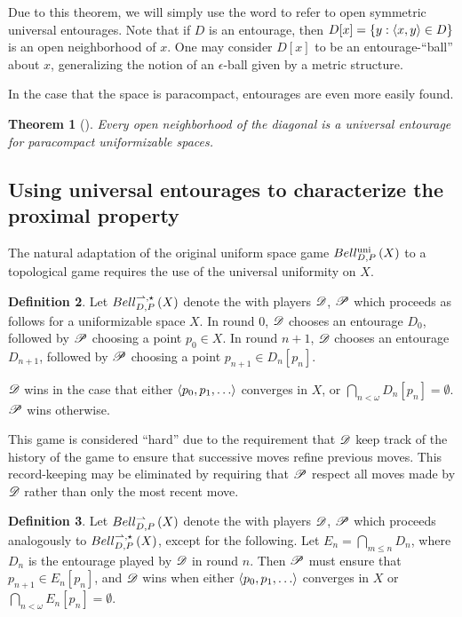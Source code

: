 \documentclass{amsart}
\newtheorem{theorem}{Theorem}[section]
\theoremstyle{definition}
\newtheorem{definition}[theorem]{Definition}
\begin{document}
  Due to this theorem, we will simply use the word  to refer
  to open symmetric universal entourages. Note that if \(D\) is an
  entourage, then \(D[x]=\{y:\langle x,y\rangle\in D\}\) is an open neighborhood of \(x\).
  One may consider
  \(D[x]\) to be an entourage-``ball'' about \(x\), generalizing the notion of
  an \(\epsilon\)-ball given by a metric structure.

  In the case that
  the space is paracompact, entourages are even more easily found.

  \begin{theorem}[\cite{MR2048350}]
    Every open neighborhood of the diagonal is a universal entourage for
    paracompact uniformizable spaces.
  \end{theorem}

\subsection{Using universal entourages to characterize the proximal property}

  The natural adaptation of the original uniform space game \(Bell_{D,P}^{\textrm{uni}}\left({X}\right)\)
  to a topological game requires the use of the universal uniformity on \(X\).

  \begin{definition}
    Let \(Bell_{D,P}^{\rightharpoonup,\star}\left({X}\right)\) denote the  with
    players \(\mathscr{D}\), \(\mathscr{P}\) which proceeds as follows for
    a uniformizable space \(X\). In round \(0\),
    \(\mathscr{D}\) chooses an entourage \(D_0\), followed by \(\mathscr{P}\)
    choosing a point \(p_0\in X\). In round \(n+1\),
    \(\mathscr{D}\) chooses an entourage
    \(D_{n+1}\), followed by \(\mathscr{P}\) choosing a point \(p_{n+1}\in D_n[p_n]\).

    \(\mathscr{D}\) wins in the case that either
    \(\<p_0,p_1,\dots\>\) converges in \(X\),
    or \(\bigcap_{n<\omega}D_n[p_n] = \emptyset\). \(\mathscr{P}\) wins otherwise.
  \end{definition}

  This game is considered ``hard'' due to the requirement that \(\mathscr{D}\)
  keep track of the history of the game to ensure that successive
  moves refine previous moves. This record-keeping may be eliminated by
  requiring that \(\mathscr{P}\) respect all moves made by \(\mathscr{D}\) rather than only
  the most recent move.

  \begin{definition}
    Let \(Bell_{D,P}^{\rightharpoonup}\left({X}\right)\) denote the  with players
    \(\mathscr{D}\), \(\mathscr{P}\) which proceeds analogously to \(Bell_{D,P}^{\rightharpoonup,\star}\left({X}\right)\),
    except for the following. Let \(E_n=\bigcap_{m\leq n}D_n\), where \(D_n\) is
    the entourage played by \(\mathscr{D}\) in round \(n\).
    Then \(\mathscr{P}\) must ensure that \(p_{n+1}\in E_n[p_n]\),
    and \(\mathscr{D}\) wins when either \(\<p_0,p_1,\dots\>\) converges in \(X\)
    or \(\bigcap_{n<\omega}E_n[p_n] = \emptyset\).
  \end{definition}
\end{document}
